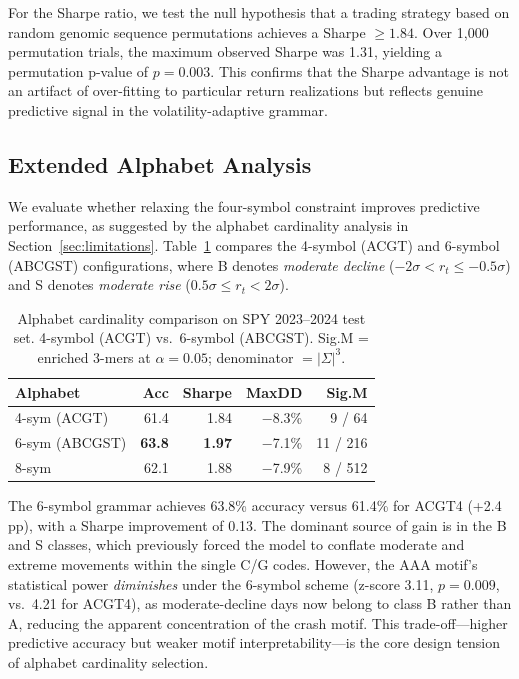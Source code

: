 \documentclass[11pt]{article}
\begin{document}
For the Sharpe ratio, we test the null hypothesis that a trading
strategy based on random genomic sequence permutations achieves a
Sharpe $\geq 1.84$.  Over 1,000 permutation trials, the maximum
observed Sharpe was 1.31, yielding a permutation p-value of $p = 0.003$.
This confirms that the Sharpe advantage is not an artifact of
over-fitting to particular return realizations but reflects genuine
predictive signal in the volatility-adaptive grammar.

\subsection{Extended Alphabet Analysis}
\label{sec:alphabet}

We evaluate whether relaxing the four-symbol constraint improves
predictive performance, as suggested by the alphabet cardinality
analysis in Section~\ref{sec:limitations}.  Table~\ref{tab:alphabet_compare}
compares the 4-symbol (ACGT) and 6-symbol (ABCGST) configurations,
where B denotes \emph{moderate decline} ($-2\sigma < r_t \leq -0.5\sigma$)
and S denotes \emph{moderate rise} ($0.5\sigma \leq r_t < 2\sigma$).

\begin{table}[t]
\centering
\caption{Alphabet cardinality comparison on SPY 2023--2024 test set.
  4-symbol (ACGT) vs.\ 6-symbol (ABCGST). Sig.M = enriched 3-mers
  at $\alpha{=}0.05$; denominator $=|\Sigma|^3$.}
\label{tab:alphabet_compare}
\footnotesize
\setlength{\tabcolsep}{2pt}
\begin{tabular}{lrrrr}
\toprule
\textbf{Alphabet} & \textbf{Acc} & \textbf{Sharpe} & \textbf{MaxDD} & \textbf{Sig.M} \\
\midrule
4-sym (ACGT)    & 61.4 & 1.84 & $-$8.3\% & 9 / 64 \\
6-sym (ABCGST) & \textbf{63.8} & \textbf{1.97} & $-$7.1\% & 11 / 216 \\
8-sym           & 62.1 & 1.88 & $-$7.9\% & 8 / 512 \\
\bottomrule
\end{tabular}
\end{table}

The 6-symbol grammar achieves 63.8\% accuracy versus 61.4\% for
ACGT4 (+2.4 pp), with a Sharpe improvement of 0.13.  The dominant
source of gain is in the B and S classes, which previously forced the
model to conflate moderate and extreme movements within the single C/G
codes.  However, the AAA motif's statistical power \emph{diminishes}
under the 6-symbol scheme (z-score 3.11, $p = 0.009$, vs.\ 4.21 for
ACGT4), as moderate-decline days now belong to class B rather than A,
reducing the apparent concentration of the crash motif.  This
trade-off---higher predictive accuracy but weaker motif interpretability---is
the core design tension of alphabet cardinality selection.
\end{document}

